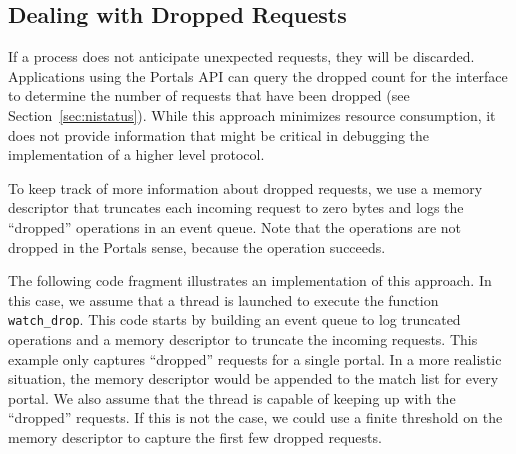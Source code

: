 \documentclass{sand-report}
\begin{document}
\subsection{Dealing with Dropped Requests}\label{sec:exdrop}

If a process does not anticipate unexpected requests, they will be
discarded.  Applications using the Portals API can query the dropped
count for the interface to determine the number of requests that have
been dropped (see Section~\ref{sec:nistatus}).  While this approach
minimizes resource consumption, it does not provide information that
might be critical in debugging the implementation of a higher level
protocol.

To keep track of more information about dropped requests, we use a
memory descriptor that truncates each incoming request to zero bytes
and logs the ``dropped'' operations in an event queue.  Note that the
operations are not dropped in the Portals sense, because the operation
succeeds.

The following code fragment illustrates an implementation of this
approach.  In this case, we assume that a thread is launched to
execute the function \texttt{watch_drop}.  This code starts by
building an event queue to log truncated operations and a memory
descriptor to truncate the incoming requests.  This example only
captures ``dropped'' requests for a single portal.  In a more
realistic situation, the memory descriptor would be appended to the
match list for every portal.  We also assume that the thread is
capable of keeping up with the ``dropped'' requests. If this is not
the case, we could use a finite threshold on the memory descriptor to
capture the first few dropped requests.
\end{document}
